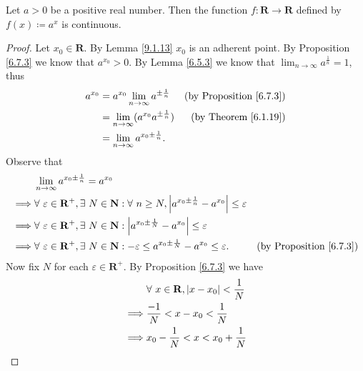 \begin{proposition}\label{9.4.10}
    Let \(a > 0\) be a positive real number.
    Then the function \(f : \mathbf{R} \to \mathbf{R}\) defined by \(f(x) \coloneqq a^x\) is continuous.
\end{proposition}

\begin{proof}
    Let \(x_0 \in \mathbf{R}\).
    By Lemma \ref{9.1.13} \(x_0\) is an adherent point.
    By Proposition \ref{6.7.3} we know that \(a^{x_0} > 0\).
    By Lemma \ref{6.5.3} we know that \(\lim_{n \to \infty} a^{\frac{1}{n}} = 1\), thus
    \begin{align*}
        a^{x_0} & = a^{x_0} \lim_{n \to \infty} a^{\pm \frac{1}{n}}   & \text{(by Proposition \ref{6.7.3})} \\
                & = \lim_{n \to \infty} (a^{x_0} a^{\pm \frac{1}{n}}) & \text{(by Theorem \ref{6.1.19})}    \\
                & = \lim_{n \to \infty} a^{x_0 \pm \frac{1}{n}}.
    \end{align*}
    Observe that
    \begin{align*}
                 & \lim_{n \to \infty} a^{x_0 \pm \frac{1}{n}} = a^{x_0}                                                                                                                                 \\
        \implies & \forall\ \varepsilon \in \mathbf{R}^+, \exists\ N \in \mathbf{N} : \forall\ n \geq N, \abs*{a^{x_0 \pm \frac{1}{n}} - a^{x_0}} \leq \varepsilon                                       \\
        \implies & \forall\ \varepsilon \in \mathbf{R}^+, \exists\ N \in \mathbf{N} : \abs*{a^{x_0 \pm \frac{1}{N}} - a^{x_0}} \leq \varepsilon                                                          \\
        \implies & \forall\ \varepsilon \in \mathbf{R}^+, \exists\ N \in \mathbf{N} : -\varepsilon \leq a^{x_0 \pm \frac{1}{N}} - a^{x_0} \leq \varepsilon.        & \text{(by Proposition \ref{6.7.3})}
    \end{align*}
    Now fix \(N\) for each \(\varepsilon \in \mathbf{R}^+\).
    By Proposition \ref{6.7.3} we have
    \begin{align*}
                 & \forall\ x \in \mathbf{R}, \abs*{x - x_0} < \frac{1}{N} \\
        \implies & \frac{-1}{N} < x - x_0 < \frac{1}{N}                    \\
        \implies & x_0 - \frac{1}{N} < x < x_0 + \frac{1}{N}               \\

\end{align*}
\end{proof}
